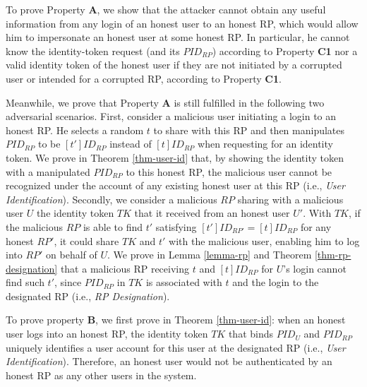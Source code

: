 To prove Property {\bf A}, we show that the attacker cannot obtain any useful information from any login of an honest user to an honest RP, which would allow him to impersonate an honest user at some honest RP. In particular, he cannot know the identity-token request (and its $PID_{RP}$) according to Property {\bf C1} nor a valid identity token of the honest user if they are not initiated by a corrupted user or intended for a corrupted RP, according to Property {\bf C1}.  

Meanwhile, we prove that Property {\bf A} is still fulfilled in the following two adversarial scenarios. First, consider a malicious user initiating a login to an honest RP. He selects a random $t$ to share with this RP and then manipulates $PID_{RP}$ to be $[t']ID_{RP}$ instead of $[t]ID_{RP}$ when requesting for an identity token. We prove in Theorem \ref{thm-user-id} that, by showing the identity token with a manipulated $PID_{RP}$ to this honest RP, the malicious user cannot be recognized under the account of any existing honest user at this RP (i.e., {\em User Identification}). Secondly, we consider a malicious $RP$ sharing with a malicious user $U$ the identity token $TK$ that it received from an honest user $U'$. With $TK$, if the malicious $RP$ is able to find $t'$ satisfying $[t']ID_{RP'}=[t]ID_{RP}$ for any honest $RP'$, it could share $TK$ and $t'$ with the malicious user, enabling him to log into $RP'$ on behalf of $U$. We prove in Lemma \ref{lemma-rp} and Theorem \ref{thm-rp-designation} that a malicious RP receiving $t$ and $[t]ID_{RP}$ for $U$'s login cannot find such $t'$, since $PID_{RP}$ in $TK$ is associated with $t$ and the login to the designated RP (i.e., {\em RP Designation}).


To prove property {\bf B}, we first prove in Theorem \ref{thm-user-id}: when an honest user logs into an honest RP, the identity token $TK$ that binds $PID_U$ and $PID_{RP}$ uniquely identifies a user account for this user at the designated RP (i.e., {\em User Identification}). Therefore, an honest user would not be authenticated by an honest RP as any other users in the system.

